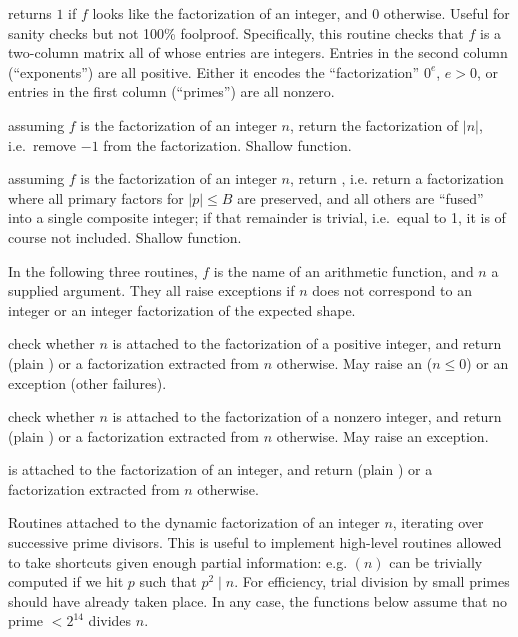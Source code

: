  returns $1$ if $f$ looks like the
factorization of an integer, and $0$ otherwise. Useful for sanity
checks but not 100\% foolproof. Specifically, this routine checks that $f$ is
a two-column matrix all of whose entries are integers. Entries in the second
column (``exponents'') are all positive. Either it encodes the
``factorization'' $0^e$, $e > 0$, or entries in the first column (``primes'')
are all nonzero.

 assuming $f$ is the factorization of an
integer $n$, return the factorization of $|n|$, i.e.~remove $-1$ from the
factorization. Shallow function.

 assuming $f$ is the
factorization of an integer $n$, return , i.e.
return a factorization where all primary factors for $|p| \leq B$
are preserved, and all others are ``fused'' into a single composite
integer; if that remainder is trivial, i.e.~equal to 1, it is of course
not included. Shallow function.

In the following three routines, $f$ is the name of an arithmetic function,
and $n$ a supplied argument. They all raise exceptions if $n$ does not
correspond to an integer or an integer factorization of the expected shape.

 check whether $n$
is attached to the factorization of a positive integer, and return
 (plain ) or a factorization extracted from $n$ otherwise.
May raise an  ($n \leq 0$) or an  exception (other
failures).

 check whether $n$
is attached to the factorization of a nonzero integer, and return
 (plain ) or a factorization extracted from $n$ otherwise.
May raise an  exception.

is attached to the factorization of an integer, and return 
(plain ) or a factorization extracted from $n$ otherwise.


Routines attached to the dynamic factorization of an integer $n$, iterating
over successive prime divisors. This is useful to implement high-level
routines allowed to take shortcuts given enough partial information: e.g.
$(n)$ can be trivially computed if we hit $p$ such that $p^2
\mid n$. For efficiency, trial division by small primes should have already
taken place. In any case, the functions below assume that no prime $< 2^{14}$
divides $n$.

